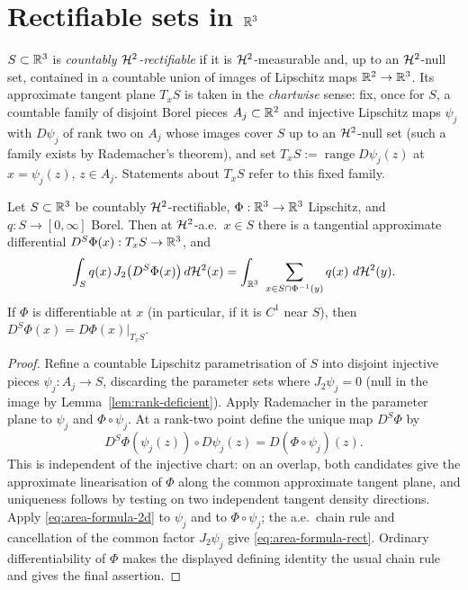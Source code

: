 \section{Rectifiable sets in $\mathbb R^3$}

\begin{definition}\label{def:rectifiable}
$S\subset\mathbb R^3$ is \emph{countably $\mathcal H^2$-rectifiable} if it is
$\mathcal H^2$-measurable and, up to an $\mathcal H^2$-null set, contained in a countable
union of images of Lipschitz maps $\mathbb R^2\to\mathbb R^3$.  Its approximate tangent
plane $T_xS$ is taken in the \emph{chartwise} sense: fix, once for $S$, a
countable family of disjoint Borel pieces $A_j\subset\mathbb R^2$ and injective
Lipschitz maps $\psi_j$ with $D\psi_j$ of rank two on $A_j$ whose images cover
$S$ up to an $\mathcal H^2$-null set (such a family exists by Rademacher's theorem),
and set $T_xS:=\operatorname{range}D\psi_j(z)$ at $x=\psi_j(z)$, $z\in A_j$.
Statements about $T_xS$ refer to this fixed family.
\end{definition}

\begin{theorem}\label{thm:area-formula-rect}
Let $S\subset\mathbb R^3$ be countably $\mathcal H^2$-rectifiable, $\Phi:\mathbb R^3\to\mathbb R^3$
Lipschitz, and $q:S\to[0,\infty]$ Borel.  Then at $\mathcal H^2$-a.e.\ $x\in S$
there is a tangential approximate differential
$D^S\Phi(x):T_xS\to\mathbb R^3$, and
\begin{equation}\label{eq:area-formula-rect}
  \int_Sq(x)\,J_2\bigl(D^S\Phi(x)\bigr)\,d\mathcal H^2(x)
  =\int_{\mathbb R^3}\ \sum_{x\in S\cap\Phi^{-1}(y)}q(x)\ d\mathcal H^2(y).
\end{equation}
If $\Phi$ is differentiable at $x$ (in particular, if it is $C^1$ near
$S$), then $D^S\Phi(x)=D\Phi(x)|_{T_xS}$.
\end{theorem}

\begin{proof}
Refine a countable Lipschitz parametrisation of $S$ into disjoint injective
pieces $\psi_j:A_j\to S$, discarding the parameter sets where
$J_2\psi_j=0$ (null in the image by Lemma~\ref{lem:rank-deficient}).  Apply
Rademacher in the parameter plane to $\psi_j$ and $\Phi\circ\psi_j$.  At a
rank-two point define the unique map $D^S\Phi$ by
\[
 D^S\Phi(\psi_j(z))\circ D\psi_j(z)=D(\Phi\circ\psi_j)(z).
\]
This is independent of the injective chart: on an overlap, both candidates
give the approximate linearisation of $\Phi$ along the common approximate
tangent plane, and uniqueness follows by testing on two independent tangent
density directions.  Apply \eqref{eq:area-formula-2d} to $\psi_j$ and to
$\Phi\circ\psi_j$; the a.e.\ chain rule and cancellation of the common factor
$J_2\psi_j$ give \eqref{eq:area-formula-rect}.  Ordinary differentiability of
$\Phi$ makes the displayed defining identity the usual chain rule and gives
the final assertion.
\end{proof}

